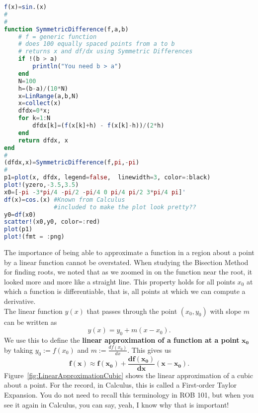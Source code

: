 \begin{lstlisting}[language=Julia,style=mystyle]
f(x)=sin.(x)
#
#
function SymmetricDifference(f,a,b)
    # f = generic function
    # does 100 equally spaced points from a to b
    # returns x and df/dx using Symmetric Differences
    if !(b > a)
        println("You need b > a")
    end
    N=100
    h=(b-a)/(10*N)
    x=LinRange(a,b,N) 
    x=collect(x)
    dfdx=0*x;
    for k=1:N
        dfdx[k]=(f(x[k]+h) - f(x[k]-h))/(2*h)
    end
    return dfdx, x
end
#
(dfdx,x)=SymmetricDifference(f,pi,-pi)
#
p1=plot(x, dfdx, legend=false,  linewidth=3, color=:black)
plot!(yzero,-3.5,3.5)
x0=[-pi -3*pi/4 -pi/2 -pi/4 0 pi/4 pi/2 3*pi/4 pi]'
df(x)=cos.(x) #Known from Calculus
              #included to make the plot look pretty??
y0=df(x0)
scatter!(x0,y0, color=:red)
plot(p1)
plot!(fmt = :png) 
\end{lstlisting}


\vspace*{0.2cm}
\begin{tcolorbox}[sharp corners, colback=green!30, colframe=green!80!blue, title=\textbf{\large Linear Approximation at a Point}]

The importance of being able to approximate a function in a region about a point by a linear function cannot be overstated. When studying the Bisection Method for finding roots, we noted that as we zoomed in on the function near the root, it looked more and more like a straight line. This property holds for all points $x_0$ at which a function is differentiable, that is, all points at which we can compute a derivative. \\

The linear function $y(x)$ that passes through the point $(x_0,y_0)$ with slope $m$ can be written as
$$y(x) = y_0 + m \left(x-x_0 \right). $$
We use this to define the \textbf{linear approximation of a function at a point} $\mathbf{x_0}$ by taking $y_0:=f(x_0)$ and $m:=\frac{df(x_0)}{dx}$. This gives us
\begin{equation}
    \label{eq:DefineLinearApproxScalarFunction}
   \boxed{\mathbf{ f(x)\approx f(x_0) + \frac{df(x_0)}{dx} \left(x-x_0 \right)}.}
\end{equation}
Figure~\ref{fig:LinearApproximationCubic} shows the linear approximation of a cubic about a point. For the record, in Calculus, this is called a First-order Taylor Expansion. You do not need to recall this terminology in ROB 101, but when you see it again in Calculus, you can say, yeah, I know why that is important! 

\end{tcolorbox}


